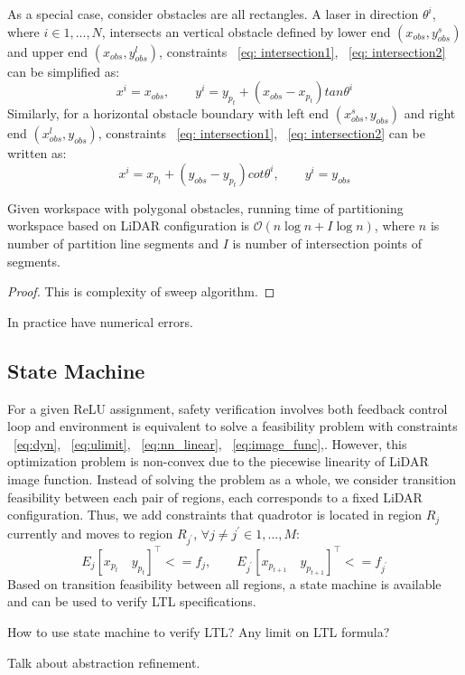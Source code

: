 As a special case, consider obstacles are all rectangles. 
A laser in direction $\theta^i$, where $i \in {1, ..., N}$, intersects an vertical obstacle 
defined by lower end $(x_{obs}, y_{obs}^s)$ and upper end $(x_{obs}, y_{obs}^l)$, 
constraints ~\eqref{eq: intersection1}, ~\eqref{eq: intersection2} can be simplified as:
\begin{equation}
    \label{eq:vertical}
    x^i = x_{obs}, \qquad y^i = y_{p_t} + (x_{obs} - x_{p_t}) tan \theta^i
\end{equation}
Similarly, for a horizontal obstacle boundary with left end $(x_{obs}^s, y_{obs})$ and right end $(x_{obs}^l, y_{obs})$,
constraints ~\eqref{eq: intersection1}, ~\eqref{eq: intersection2} can be written as:
\begin{equation} 
    \label{eq:horizontal}
    x^i = x_{p_t} + (y_{obs} - y_{p_t}) cot \theta^i, \qquad y^i = y_{obs}
\end{equation}


\begin{theorem}
    Given workspace with polygonal obstacles, running time of partitioning workspace based on LiDAR configuration is
    $\mathcal{O}(n\log{}n + I\log{}n)$, where $n$ is number of partition line segments 
    and $I$ is number of intersection points of segments.
    \begin{proof}
        {\color{blue} This is complexity of sweep algorithm.} 
    \end{proof}
\end{theorem}    

{\color{blue} In practice have numerical errors.}



\subsection{State Machine}


For a given ReLU assignment, safety verification involves both feedback control loop and environment 
is equivalent to solve a feasibility problem with constraints 
~\eqref{eq:dyn}, ~\eqref{eq:ulimit}, ~\eqref{eq:nn_linear}, ~\eqref{eq:image_func},.
However, this optimization problem is non-convex due to the piecewise linearity of LiDAR image function.
Instead of solving the problem as a whole, we consider transition feasibility between 
each pair of regions, each corresponds to a fixed LiDAR configuration. 
Thus, we add constraints that quadrotor is located in region $R_j$ currently and moves to region $R_{j^\prime}$,
$\forall j \neq j^\prime \in {1, ..., M}$:
\begin{equation}
    \label{eq:region}
    E_j[x_{p_t} \quad y_{p_t}]^\intercal <= f_j, \qquad E_{j^\prime}[x_{p_{t+1}} \quad y_{p_{t+1}}]^\intercal <= f_{j^\prime}
\end{equation}
Based on transition feasibility between all regions, a state machine is available and can be used to verify
LTL specifications.

{\color{blue} How to use state machine to verify LTL?}
{\color{blue} Any limit on LTL formula?}

{\color{blue} Talk about abstraction refinement.}


